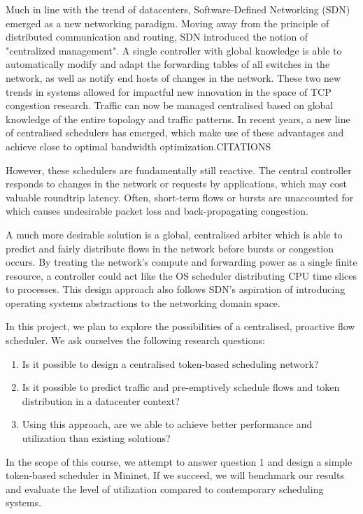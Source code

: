 Much in line with the trend of datacenters, Software-Defined Networking (SDN) emerged as a new networking paradigm. Moving away from the principle of distributed communication and routing, SDN introduced the notion of "centralized management". A single controller with global knowledge is able to automatically modify and adapt the forwarding tables of all switches in the network, as well as notify end hosts of changes in the network.
These two new trends in systems allowed for impactful new innovation in the space of TCP congestion research. Traffic can now be managed centralised based on global knowledge of the entire topology and traffic patterns. In recent years, a new line of centralised schedulers has emerged, which make use of these advantages and achieve close to optimal bandwidth optimization.{CITATIONS}

However, these schedulers are fundamentally still reactive. The central controller responds to changes in the network or requests by applications, which may cost valuable roundtrip latency. Often, short-term flows or bursts are unaccounted for which causes undesirable packet loss and back-propagating congestion. 

A much more desirable solution is a global, centralised arbiter which is able to predict and fairly distribute flows in the network before bursts or congestion occurs.  By treating the network’s compute and forwarding power as a single finite resource, a controller could act like the OS scheduler distributing CPU time slices to processes. This design approach also follows SDN's aspiration of introducing operating systems abstractions to the networking domain space.

In this project, we plan to explore the possibilities of a centralised, proactive flow scheduler. We ask ourselves the following research questions:
\begin{enumerate}
\item Is it possible to design a centralised token-based scheduling network?
\item Is it possible to predict traffic and pre-emptively schedule flows and token distribution in a datacenter context?
\item Using this approach, are we able to achieve better performance and utilization than existing solutions?
\end{enumerate}

In the scope of this course, we attempt to answer question 1 and design a simple token-based scheduler in Mininet. If we succeed, we will benchmark our results and evaluate the level of utilization compared to contemporary scheduling systems.


